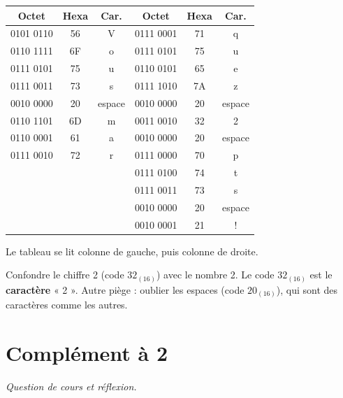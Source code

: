 \documentclass[addpoints, 11pt]{exam}
\newcommand{\enonce}[1]{\textit{#1}\par\smallskip}
\DeclareRobustCommand{\_}{\textunderscore\allowbreak}
\begin{document}
\begin{questions}
\begin{center}
\small
\begin{tabular}{|c|c|c||c|c|c|}
\hline
Octet & Hexa & Car. & Octet & Hexa & Car. \\ \hline
0101 0110 & 56 & V & 0111 0001 & 71 & q \\
0110 1111 & 6F & o & 0111 0101 & 75 & u \\
0111 0101 & 75 & u & 0110 0101 & 65 & e \\
0111 0011 & 73 & s & 0111 1010 & 7A & z \\
0010 0000 & 20 & espace & 0010 0000 & 20 & espace \\
0110 1101 & 6D & m & 0011 0010 & 32 & 2 \\
0110 0001 & 61 & a & 0010 0000 & 20 & espace \\
0111 0010 & 72 & r & 0111 0000 & 70 & p \\
 & & & 0111 0100 & 74 & t \\
 & & & 0111 0011 & 73 & s \\
 & & & 0010 0000 & 20 & espace \\
 & & & 0010 0001 & 21 & ! \\ \hline
\end{tabular}
\end{center}
Le tableau se lit colonne de gauche, puis colonne de droite.

\begin{erreur}
Confondre le chiffre 2 (code $32_{(16)}$) avec le nombre 2. Le code $32_{(16)}$ est le \textbf{caractère} « 2 ». Autre piège : oublier les espaces (code $20_{(16)}$), qui sont des caractères comme les autres.
\end{erreur}

\section{Complément à 2}

\question[3] \enonce{Question de cours et réflexion.}
\end{questions}
\end{document}
